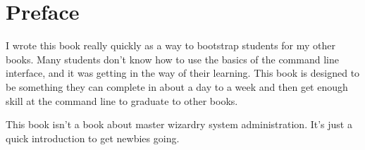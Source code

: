 \chapter*{Preface}

I wrote this book really quickly as a way to bootstrap students for my other books.
Many students don't know how to use the basics of the command line interface, and
it was getting in the way of their learning.  This book is designed to be something
they can complete in about a day to a week and then get enough skill at the command
line to graduate to other books.

This book isn't a book about master wizardry system administration.  It's just a quick
introduction to get newbies going.
